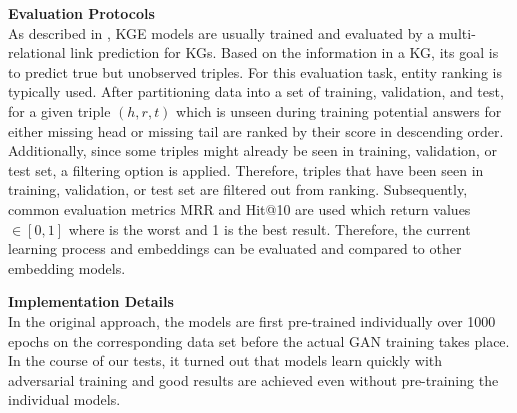 \textbf{Evaluation Protocols}\\
As described in \cite{Ruffinelli2020You},
\ac{KGE} models are usually trained and evaluated by a multi-relational link prediction for \acp{KG}.
Based on the information in a \ac{KG}, its goal is to predict true but unobserved triples.
For this evaluation task, entity ranking is typically used.
After partitioning data into a set of training, validation, and test, for a given triple $(h,r,t)$ which is unseen during training potential answers for either missing head or missing tail are ranked by their score in descending order.
Additionally, since some triples might already be seen in training, validation, or test set, a filtering option is applied.
Therefore, triples that have been seen in training, validation, or test set are filtered out from ranking.
Subsequently, common evaluation metrics MRR and Hit@10 are used which return values $\in [0,1]$ where is the worst and 1 is the best result.
Therefore, the current learning process and embeddings can be evaluated and compared to other embedding models.

\textbf{Implementation Details}\\
In the original \kbgan approach, the models are first pre-trained individually over 1000 epochs on the corresponding data set before the actual \ac{GAN} training takes place.
In the course of our tests, it turned out that models learn quickly with adversarial training and good results are achieved even without pre-training the individual models.

